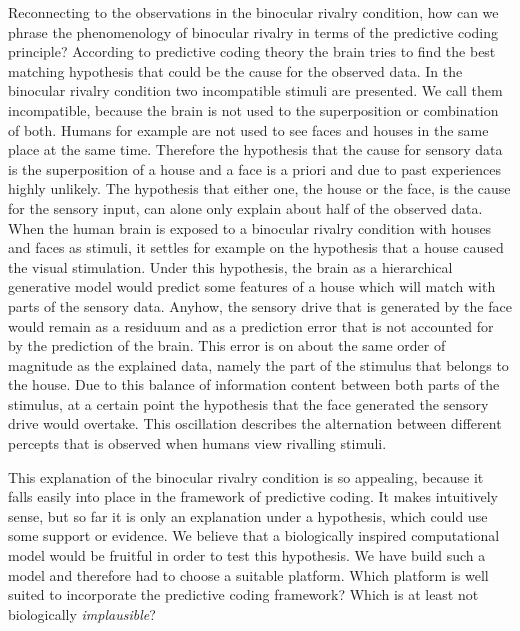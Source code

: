 \documentclass[utf8]{frontiersSCNS} %
\begin{document}
Reconnecting to the observations in the binocular rivalry condition, how can we phrase the phenomenology of binocular rivalry in terms of the predictive coding principle? According to predictive coding theory the brain tries to find the best matching hypothesis that could be the cause for the observed data. In the binocular rivalry condition two incompatible stimuli are presented. We call them incompatible, because the brain is not used to the superposition or combination of both. Humans for example are not used to see faces and houses in the same place at the same time. Therefore the hypothesis that the cause for sensory data is the superposition of a house and a face is a priori and due to past experiences highly unlikely. The hypothesis that either one, the house or the face, is the cause for the sensory input, can alone only explain about half of the observed data. When the human brain is exposed to a binocular rivalry condition with houses and faces as stimuli, it settles for example on the hypothesis that a house caused the visual stimulation. Under this hypothesis, the brain as a hierarchical generative model would predict some features of a house which will match with parts of the sensory data. Anyhow, the sensory drive that is generated by the face would remain as a residuum and as a prediction error that is not accounted for by the prediction of the brain. This error is on about the same order of magnitude as the explained data, namely the part of the stimulus that belongs to the house. Due to this balance of information content between both parts of the stimulus, at a certain point the hypothesis that the face generated the sensory drive would overtake. This oscillation describes the alternation between different percepts that is observed when humans view rivalling stimuli.

This explanation of the binocular rivalry condition is so appealing, because it falls easily into place in the framework of predictive coding. It makes intuitively sense, but so far it is only an explanation under a hypothesis, which could use some support or evidence. We believe that a biologically inspired computational model would be fruitful in order to test this hypothesis. We have build such a model and therefore had to choose a suitable platform. Which platform is well suited to incorporate the predictive coding framework? Which is at least not biologically \textit{implausible}? 
\end{document}
